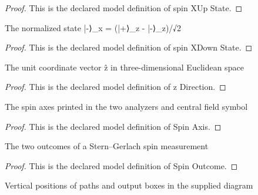 \begin{proof}
  This is the declared model definition of spin XUp State.
\end{proof}
\begin{definition}
  \label{def:physics:phyx-mini-0543:phyxminiproblems-problemphyxmini0543-spinxdownstate}
  The normalized state |-⟩\_x = (|+⟩\_z - |-⟩\_z)/√2
\end{definition}
\begin{proof}
  This is the declared model definition of spin XDown State.
\end{proof}
\begin{definition}[z Direction]
  \label{def:physics:phyx-mini-0543:phyxminiproblems-problemphyxmini0543-zdirection}
  The unit coordinate vector ẑ in three-dimensional Euclidean space
\end{definition}
\begin{proof}
  This is the declared model definition of z Direction.
\end{proof}
\begin{definition}
  \label{def:physics:phyx-mini-0543:phyxminiproblems-problemphyxmini0543-spinaxis}
  The spin axes printed in the two analyzers and central field symbol
\end{definition}
\begin{proof}
  This is the declared model definition of Spin Axis.
\end{proof}
\begin{definition}
  \label{def:physics:phyx-mini-0543:phyxminiproblems-problemphyxmini0543-spinoutcome}
  The two outcomes of a Stern--Gerlach spin measurement
\end{definition}
\begin{proof}
  This is the declared model definition of Spin Outcome.
\end{proof}
\begin{definition}
  \label{def:physics:phyx-mini-0543:phyxminiproblems-problemphyxmini0543-figurebranchposition}
  Vertical positions of paths and output boxes in the supplied diagram
\end{definition}
